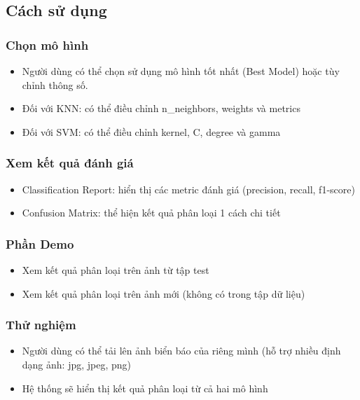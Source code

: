 \documentclass[a4paper,12pt]{article}
\begin{document}
\subsection{Cách sử dụng}
\subsubsection{Chọn mô hình}
\begin{itemize}
    \item Người dùng có thể chọn sử dụng mô hình tốt nhất (Best Model) hoặc tùy chỉnh thông số.
    \item Đối với KNN: có thể điều chỉnh n\_neighbors, weights và metrics
    \item Đối với SVM: có thể điều chỉnh kernel, C, degree và gamma
\end{itemize}

\subsubsection{Xem kết quả đánh giá}
\begin{itemize}
    \item Classification Report: hiển thị các metric đánh giá (precision, recall, f1-score)
    \item Confusion Matrix: thể hiện kết quả phân loại 1 cách chi tiết
\end{itemize}

\subsubsection{Phần Demo}
\begin{itemize}
    \item Xem kết quả phân loại trên ảnh từ tập test
    \item Xem kết quả phân loại trên ảnh mới (không có trong tập dữ liệu)
\end{itemize}

\subsubsection{Thử nghiệm}
\begin{itemize}
    \item Người dùng có thể tải lên ảnh biển báo của riêng mình (hỗ trợ nhiều định dạng ảnh: jpg, jpeg, png)
    \item Hệ thống sẽ hiển thị kết quả phân loại từ cả hai mô hình
\end{itemize}
\end{document}
